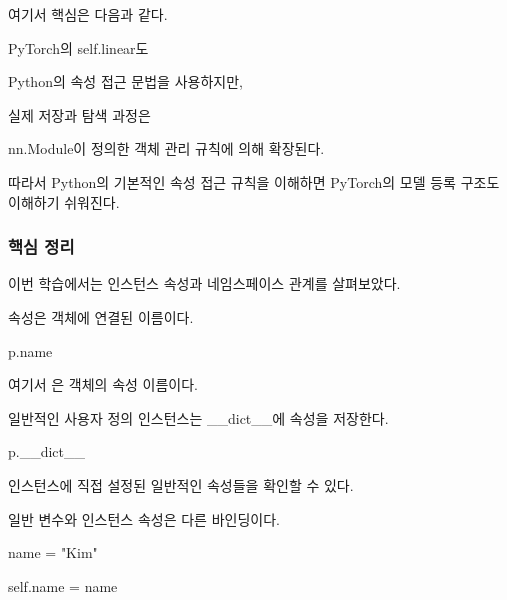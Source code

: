 여기서 핵심은 다음과 같다.

\begin{dhksmry}[centered]
PyTorch의 self.linear도

Python의 속성 접근 문법을 사용하지만,

실제 저장과 탐색 과정은 

nn.Module이 정의한 객체 관리 규칙에 의해 확장된다.
\end{dhksmry}

따라서 Python의 기본적인 속성 접근 규칙을 이해하면 PyTorch의 모델 등록 구조도 이해하기 쉬워진다.

\subsubsection{핵심 정리}

이번 학습에서는 인스턴스 속성과 네임스페이스 관계를 살펴보았다.

\begin{dhknote}
\begin{dhksmry}[centered]
속성은 객체에 연결된 이름이다.
\end{dhksmry}
\end{dhknote}

\begin{dhkcode}
p.name
\end{dhkcode}

여기서 은  객체의 속성 이름이다.

\begin{dhknote}
\begin{dhksmry}[centered]
일반적인 사용자 정의 인스턴스는 __dict__에 속성을 저장한다.
\end{dhksmry}
\end{dhknote}

\begin{dhkcode}
p.__dict__
\end{dhkcode}

인스턴스에 직접 설정된 일반적인 속성들을 확인할 수 있다.

\begin{dhknote}
\begin{dhksmry}[centered]
일반 변수와 인스턴스 속성은 다른 바인딩이다.
\end{dhksmry}
\end{dhknote}

\begin{dhkcode}
name = "Kim"

self.name = name
\end{dhkcode}

